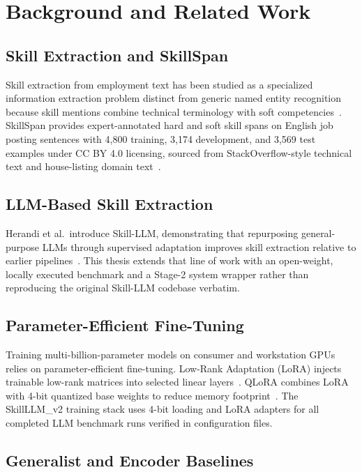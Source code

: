 \chapter{Background and Related Work}
\label{ch:related}

\section{Skill Extraction and SkillSpan}

Skill extraction from employment text has been studied as a specialized information extraction problem distinct from generic named entity recognition because skill mentions combine technical terminology with soft competencies~\cite{zhang2022skillspan}.
SkillSpan provides expert-annotated hard and soft skill spans on English job posting sentences with 4{,}800 training, 3{,}174 development, and 3{,}569 test examples under CC BY 4.0 licensing, sourced from StackOverflow-style technical text and house-listing domain text~\cite{zhang2022skillspan}.

\section{LLM-Based Skill Extraction}

Herandi et al.\ introduce Skill-LLM, demonstrating that repurposing general-purpose LLMs through supervised adaptation improves skill extraction relative to earlier pipelines~\cite{herandi2024skillllm}.
This thesis extends that line of work with an open-weight, locally executed benchmark and a Stage-2 system wrapper rather than reproducing the original Skill-LLM codebase verbatim.

\section{Parameter-Efficient Fine-Tuning}

Training multi-billion-parameter models on consumer and workstation GPUs relies on parameter-efficient fine-tuning.
Low-Rank Adaptation (LoRA) injects trainable low-rank matrices into selected linear layers~\cite{hu2022lora}.
QLoRA combines LoRA with 4-bit quantized base weights to reduce memory footprint~\cite{dettmers2023qlora}.
The SkillLLM\_v2 training stack uses 4-bit loading and LoRA adapters for all completed LLM benchmark runs verified in configuration files.

\section{Generalist and Encoder Baselines}

